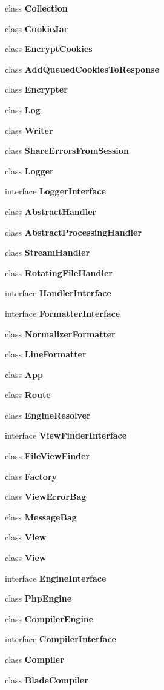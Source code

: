\begin{DoxyCompactItemize}
\item 
class {\bf Collection}
\item 
class {\bf Cookie\+Jar}
\item 
class {\bf Encrypt\+Cookies}
\item 
class {\bf Add\+Queued\+Cookies\+To\+Response}
\item 
class {\bf Encrypter}
\item 
class {\bf Log}
\item 
class {\bf Writer}
\item 
class {\bf Share\+Errors\+From\+Session}
\item 
class {\bf Logger}
\item 
interface {\bf Logger\+Interface}
\item 
class {\bf Abstract\+Handler}
\item 
class {\bf Abstract\+Processing\+Handler}
\item 
class {\bf Stream\+Handler}
\item 
class {\bf Rotating\+File\+Handler}
\item 
interface {\bf Handler\+Interface}
\item 
interface {\bf Formatter\+Interface}
\item 
class {\bf Normalizer\+Formatter}
\item 
class {\bf Line\+Formatter}
\item 
class {\bf App}
\item 
class {\bf Route}
\item 
class {\bf Engine\+Resolver}
\item 
interface {\bf View\+Finder\+Interface}
\item 
class {\bf File\+View\+Finder}
\item 
class {\bf Factory}
\item 
class {\bf View\+Error\+Bag}
\item 
class {\bf Message\+Bag}
\item 
class {\bf View}
\item 
class {\bf View}
\item 
interface {\bf Engine\+Interface}
\item 
class {\bf Php\+Engine}
\item 
class {\bf Compiler\+Engine}
\item 
interface {\bf Compiler\+Interface}
\item 
class {\bf Compiler}
\item 
class {\bf Blade\+Compiler}
\item 

\end{DoxyCompactItemize}
